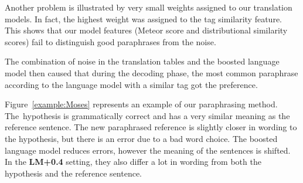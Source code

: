 \documentclass[11pt]{article}
\def\Fref#1{Figure~\ref{#1}}
\begin{document}
Another problem is illustrated by very small weights assigned to our 
translation models. In fact, the highest weight was assigned to the tag 
similarity feature. This shows that our model features (Meteor score and 
distributional similarity scores) fail to distinguish good paraphrases from the 
noise. 

The combination of noise in the translation tables and the boosted language
model then caused that during the decoding phase, the most common paraphrase
according to the language model with a similar tag got the preference. 

\Fref{example:Moses} represents an example of our paraphrasing method. The~hypothesis 
is grammatically correct and has a very similar meaning as the reference 
sentence. The new paraphrased reference is slightly closer in wording to the 
hypothesis, but there is an error due to a bad word choice. The boosted 
language model reduces errors, however the meaning of the sentences is shifted. 
In the \textbf{LM+0.4} setting, they also differ a lot in wording from both the 
hypothesis and the reference sentence.
\end{document}
